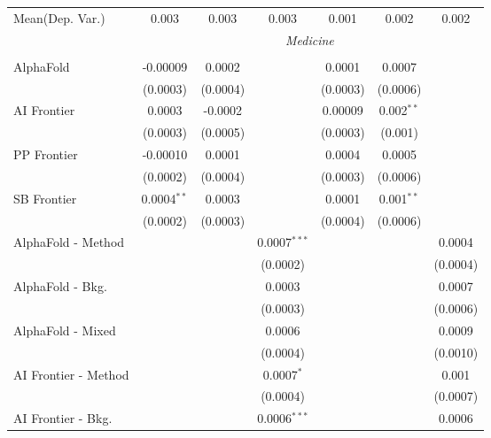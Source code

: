 \begin{tabular}{lcccccc}
Mean(Dep. Var.) & 0.003 & 0.003 & 0.003 & 0.001 & 0.002 & 0.002 \\
 & \multicolumn{6}{c}{\textit{Medicine}} \\ \\
   AlphaFold            & -0.00009      & 0.0002   &                & 0.0001   & 0.0007       &   \\   
                        & (0.0003)      & (0.0004) &                & (0.0003) & (0.0006)     &   \\   
   AI Frontier          & 0.0003        & -0.0002  &                & 0.00009  & 0.002$^{**}$ &   \\   
                        & (0.0003)      & (0.0005) &                & (0.0003) & (0.001)      &   \\   
   PP Frontier          & -0.00010      & 0.0001   &                & 0.0004   & 0.0005       &   \\   
                        & (0.0002)      & (0.0004) &                & (0.0003) & (0.0006)     &   \\   
   SB Frontier          & 0.0004$^{**}$ & 0.0003   &                & 0.0001   & 0.001$^{**}$ &   \\   
                        & (0.0002)      & (0.0003) &                & (0.0004) & (0.0006)     &   \\   
   AlphaFold - Method   &               &          & 0.0007$^{***}$ &          &              & 0.0004\\   
                        &               &          & (0.0002)       &          &              & (0.0004)\\   
   AlphaFold - Bkg.     &               &          & 0.0003         &          &              & 0.0007\\   
                        &               &          & (0.0003)       &          &              & (0.0006)\\   
   AlphaFold - Mixed    &               &          & 0.0006         &          &              & 0.0009\\   
                        &               &          & (0.0004)       &          &              & (0.0010)\\   
   AI Frontier - Method &               &          & 0.0007$^{*}$   &          &              & 0.001\\   
                        &               &          & (0.0004)       &          &              & (0.0007)\\   
   AI Frontier - Bkg.   &               &          & 0.0006$^{***}$ &          &              & 0.0006\\   

\end{tabular}
